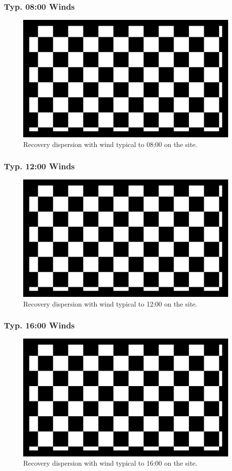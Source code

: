 \documentclass[12pt]{article}
\begin{document}
\subsubsection{Typ. 08:00 Winds}
\begin{figure}
    \centering
    \includegraphics[width=.8\textwidth]{media/0800wind.png}
    \caption{Recovery dispersion with wind typical to 08:00 on the site.}
\end{figure}
\subsubsection{Typ. 12:00 Winds}
\begin{figure}
    \centering
    \includegraphics[width=.8\textwidth]{media/1200wind.png}
    \caption{Recovery dispersion with wind typical to 12:00 on the site.}
\end{figure}
\subsubsection{Typ. 16:00 Winds}
\begin{figure}
    \centering
    \includegraphics[width=.8\textwidth]{media/1600wind.png}
    \caption{Recovery dispersion with wind typical to 16:00 on the site.}
\end{figure}
\end{document}
